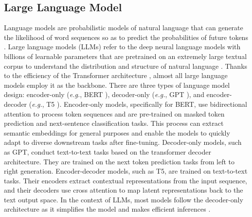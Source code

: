 \documentclass[11pt]{article}
\begin{document}
\subsection{Large Language Model}
Language models are probabilistic models of natural language that can generate the likelihood of word sequences so as to predict the probabilities of future tokens \cite{lipretrained, zhao2023survey}. 
Large language models (LLMs) refer to the deep neural language models with billions of learnable parameters that are pretrained on an extremely large textual corpus to understand the distribution and structure of natural language \cite{zhao2023survey}. Thanks to the efficiency of the Transformer architecture \cite{vaswani2017attention}, almost all large language models employ it as the backbone. There are three types of language model design: encoder-only (\emph{e.g.}, BERT \cite{kenton2019bert}), decoder-only (\emph{e.g.}, GPT \cite{radford2018improving}), and encoder-decoder (\emph{e.g.}, T5 \cite{raffel2020t5}). Encoder-only models, specifically for BERT, use bidirectional attention to process token sequences and are pre-trained on masked token prediction and next-sentence classification tasks. This process can extract semantic embeddings for general purposes and enable the models to quickly adapt to diverse downstream tasks after fine-tuning. Decoder-only models, such as GPT, conduct text-to-text tasks based on the transformer decoder architecture. They are trained on the next token prediction tasks from left to right generation. Encoder-decoder models, such as T5, are trained on text-to-text tasks. Their encoders extract contextual representations from the input sequence, and their decoders use cross attention to map latent representations back to the text output space. In the context of LLMs, most models follow the decoder-only architecture as it simplifies the model and makes efficient inferences \cite{wang2022language}.



\end{document}

